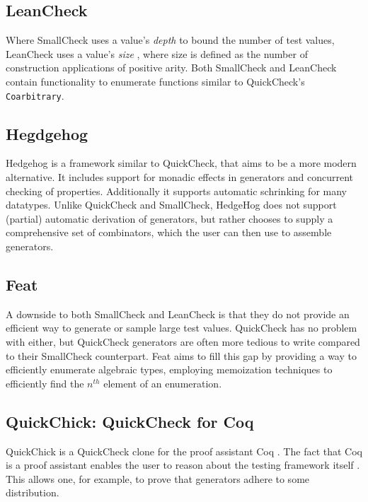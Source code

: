 \documentclass[a4paper,msc,twosized=semi]{uustthesis}
\begin{document}
\subsection{LeanCheck} 

  Where SmallCheck uses a value's \textit{depth} to bound the number of test values, 
  LeanCheck uses a value's \textit{size} \cite{matela2017tools}, where size is defined 
  as the number of construction applications of positive arity. Both SmallCheck and 
  LeanCheck contain functionality to enumerate functions similar to QuickCheck's 
  \texttt{Coarbitrary}. 

\subsection{Hegdgehog} 
  
  Hedgehog \cite{hedgehog} is a framework similar to QuickCheck, that aims to be a 
  more modern alternative. It includes support for monadic effects in generators and 
  concurrent checking of properties. Additionally it supports automatic schrinking for many datatypes. Unlike QuickCheck and SmallCheck, HedgeHog does not support (partial) automatic derivation of generators, but rather chooses to supply a comprehensive set of combinators, which the user can then use to assemble generators.

\subsection{Feat} 
  
  A downside to both SmallCheck and LeanCheck is that they do not provide an efficient 
  way to generate or sample large test values. QuickCheck has no problem with either, 
  but QuickCheck generators are often more tedious to write compared to their 
  SmallCheck counterpart. Feat \cite{duregaard2013feat} aims to fill this gap by 
  providing a way to efficiently enumerate algebraic types, employing memoization 
  techniques to efficiently find the $n^{th}$ element of an enumeration. 

\subsection{QuickChick: QuickCheck for Coq} 
  
  QuickChick is a QuickCheck clone for the proof assistant Coq \cite
  {denes2014quickchick}. The fact that Coq is a proof assistant enables the user to 
  reason about the testing framework itself \cite{paraskevopoulou2015foundational}. 
  This allows one, for example, to prove that generators adhere to some distribution. 
\end{document}
